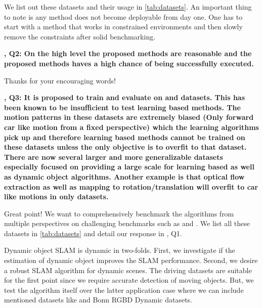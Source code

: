 \documentclass[12pt]{article}
\newcommand{\revThree}{{\color{my_magenta}{R3}}}
\begin{document}
    We list out these datasets and their usage in \cref{tab:datasets}. 
    An important thing to note is any method does not become deployable from day one. One has to start with a method that works in constrained environments and then slowly remove the constraints after solid benchmarking.

    \textbf{\revThree, Q2: On the high level the proposed methods are reasonable and the proposed methods haves a high chance of being successfully executed.
    }

    Thanks for your encouraging words!

    \textbf{\revThree, Q3: It is proposed to train and evaluate on \kitti and \waymo datasets. This has been known to be insufficient to test learning based methods. The motion patterns in these datasets are extremely biased (Only forward car like motion from a fixed perspective) which the learning algorithms pick up and therefore learning based methods cannot be trained on these datasets unless the only objective is to overfit to that dataset. There are now several larger and more generalizable datasets especially focused on providing a large scale for learning based as well as dynamic object algorithms. Another example is that optical flow extraction as well as mapping to rotation/translation will overfit to car like motions in \kitti only datasets.}

    Great point! 
    We want to comprehensively benchmark the algorithms from multiple perspectives on challenging benchmarks such as \nuscenes and \argoverseTwo. 
    We list all these datasets in \cref{tab:datasets} and detail our response in \revThree, Q1.
    
    Dynamic object SLAM is dynamic in two-folds. 
    First, we investigate if the estimation of dynamic object improves the SLAM performance.
    Second, we desire a robust SLAM algorithm for dynamic scenes.
    The driving datasets are suitable for the first point since we require accurate detection of moving objects.
    But, we test the algorithm itself over the latter application case where we can include mentioned datasets like \rugd \cite{weigness2019rugd} and Bonn RGBD Dynamic \cite{tanke2019bonn} datasets.
\end{document}
